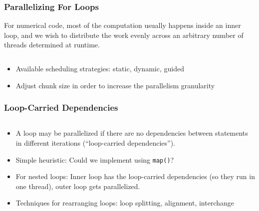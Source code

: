\documentclass[]{beamer}
\begin{document}
\begin{frame}[fragile]
  \frametitle{Parallelizing For Loops}
  For numerical code, most of the computation usually happens inside an inner loop, and we wish to distribute the work evenly across an arbitrary number of threads determined at runtime.
  \begin{columns}[t]%
    \begin{column}{0.65\textwidth}
    \end{column}
    \begin{column}{0.4\textwidth}
    \end{column}
  \end{columns}
  \begin{itemize}
  \item Available scheduling strategies: static, dynamic, guided
  \item Adjust chunk size in order to increase the parallelism granularity
  \end{itemize}
\end{frame}



\begin{frame}[fragile]
  \frametitle{Loop-Carried Dependencies}
  \begin{columns}[t]%
    \begin{column}{0.55\textwidth}
    \end{column}
    \begin{column}{0.55\textwidth}
    \end{column}
  \end{columns}
  \begin{itemize}
  \item A loop may be parallelized if there are no dependencies between statements in different iterations (``loop-carried dependencies'').
  \item Simple heuristic: Could we implement using \texttt{map()}?
  \item For nested loops: Inner loop has the loop-carried dependencies (so they run in one thread), outer loop gets parallelized.
  \item Techniques for rearranging loops: loop splitting, alignment, interchange 
  
  \end{itemize}
\end{frame}
\end{document}
